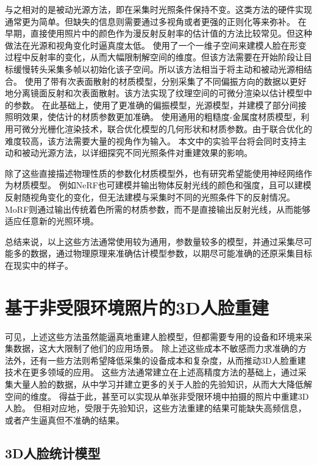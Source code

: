 与之相对的是被动光源方法，即在采集时光照条件保持不变。这类方法的硬件实现通常更为简单。但缺失的信息则需要通过多视角或者更强的正则化等来弥补。
在早期，直接使用照片中的颜色作为漫反射反射率的估计值的方法\citep{PighinHLSS98,BradleyHPS10}比较常见。但这种做法在光源和视角变化时逼真度太低。
\citet{GotardoRBGB18}使用了一个一维子空间来建模人脸在形变过程中反射率的变化，从而大幅限制解空间的维度。但该方法需要在开始阶段让目标缓慢转头采集多帧以初始化该子空间。所以该方法相当于将主动和被动光源相结合。
\citet{RiviereGBGB20}使用了带有次表面散射的材质模型，分别采集了不同偏振方向的数据以更好地分离镜面反射和次表面散射。该方法实现了纹理空间的可微分渲染以估计模型中的参数。
在此基础上，\citet{XuRZCBG22}使用了更准确的偏振模型，光源模型，并建模了部分间接照明效果，使估计的材质参数更加准确。
\citet{nvdiffrec}使用通用的粗糙度-金属度材质模型，利用可微分光栅化渲染技术，联合优化模型的几何形状和材质参数。由于联合优化的难度较高，该方法需要大量的视角作为输入。
本文中的实验平台将会同时支持主动和被动光源方法，以详细探究不同光照条件对重建效果的影响。

除了这些直接描述物理性质的参数化材质模型外，也有研究希望能使用神经网络作为材质模型。
例如NeRF\citep{nerf}也可建模并输出物体反射光线的颜色和强度，且可以建模反射随视角变化的变化，但无法建模与采集时不同的光照条件下的反射情况。
MoRF\citep{MoRF}则通过输出传统着色所需的材质参数，而不是直接输出反射光线，从而能够适应任意新的光照环境。

总结来说，以上这些方法通常使用较为通用，参数量较多的模型，并通过采集尽可能多的数据，通过物理原理来准确估计模型参数，以期尽可能准确的还原采集目标在现实中的样子。

\section{基于非受限环境照片的3D人脸重建}

可见，上述这些方法虽然能逼真地重建人脸模型，但都需要专用的设备和环境来采集数据，这大大限制了他们的应用场景。
除上述这些成本不敏感而力求准确的方法外，还有一些方法则希望降低采集的设备成本和复杂度，从而推动3D人脸重建技术在更多领域的应用。
这些方法通常建立在上述高精度方法的基础上，通过采集大量人脸的数据，从中学习并建立更多的关于人脸的先验知识，从而大大降低解空间的维度。
得益于此，甚至可以实现从单张非受限环境中拍摄的照片中重建3D人脸\citep{danzhangtuxiangsanwei}。
但相对应地，受限于先验知识，这些方法重建的结果可能缺失高频信息，或者产生逼真但不准确的结果。

\subsection{3D人脸统计模型}


